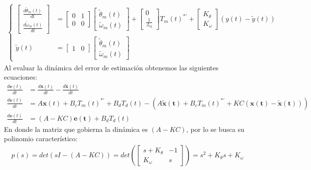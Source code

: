 \documentclass[a4paper, 10pt, onecolumn,journal]{ieeeconf}
\begin{document}
\begin{align}
	\begin{cases}
		\begin{bmatrix}
			\frac{d \tilde{\theta}_m(t)}{dt} \\ 
			\frac{d \tilde{\omega}_m(t)}{dt}
		\end{bmatrix} &= 
		\begin{bmatrix}
			0 & 1 \\ 
			0 & 0
		\end{bmatrix}
		\begin{bmatrix}
			{\tilde{\theta}}_m(t) \\ 
			{\tilde{\omega}}_m(t)
		\end{bmatrix} + 
		\begin{bmatrix}
			0 \\ 
			\frac{1}{J_{eq}}
		\end{bmatrix} {T_m(t)}^{*'} + 
		\begin{bmatrix}
			K_{\theta} \\
			K_{\omega}
		\end{bmatrix} \left(y(t) - \tilde{y}(t) \right) \\
		\tilde{y}(t) &= \begin{bmatrix}
			1 & 0
		\end{bmatrix} 
		\begin{bmatrix}
			{\tilde{\theta}}_m(t) \\ 
			{\tilde{\omega}}_m(t)
		\end{bmatrix}
	\end{cases}\label{ecuacion matricial de observador}
\end{align}
Al evaluar la dinámica del error de estimación obtenemos las siguientes ecuaciones: 
\begin{align}
	\frac{d \mathbf{e}(t)}{dt} &= \frac{d \mathbf{x}(t)}{dt} - \frac{d \mathbf{\tilde{x}} (t)}{dt}\\
	\frac{d \mathbf{e}(t)}{dt} &= A {\mathbf{x}(t)} + B_c {T_m(t)}^{*'} + B_d T_d(t) - \left( A \mathbf{\tilde{x} (t)} + B_c {T_m(t)}^{*'} + K C \left(\mathbf{x(t)} - \mathbf{\tilde{x} (t)} \right) \right) \\
	\frac{d \mathbf{e}(t)}{dt} &= \left(A - KC \right) {\mathbf{e(t)}} + B_d T_d(t)\label{dinamica del error de estimacion}
\end{align}
En donde la matriz que gobierna la dinámica es $\left(A - KC \right)$, por lo se busca su polinomio característico:
\begin{align}
	p(s) = det\left(s I - \left( A - KC\right)  \right) = det\left(\begin{bmatrix}
		s + K_{\theta} & -1 \\ 
		K_{\omega} & s
	\end{bmatrix}  
	 \right) = s^2 + K_{\theta} s + K_{\omega} \label{polinomeo caracteristico de observador}
\end{align}
\end{document}
